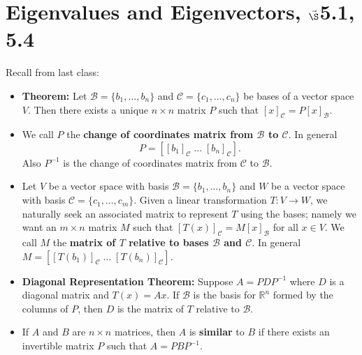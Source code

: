 


%
%
%

\section{{Eigenvalues and Eigenvectors, $\vec\S$5.1, 5.4}}%
% 

%
\thispagestyle{fancy}

Recall from last class:

\begin{itemize}
\item {\bf Theorem:} Let $\mathcal{B}=\{b_1, \dots, b_n\}$ and $\mathcal{C}=\{c_1, \dots, c_n\}$ be bases of a vector space $V$. Then there exists a unique $n\times n$ matrix $P$ such that $[x]_{\mathcal{C}}=P [x]_{\mathcal{B}}$.
\item We call $P$ the {\bf change of coordinates matrix from $\mathcal{B}$ to $\mathcal{C}$}. In general $$P= [[b_1]_\mathcal{C} \; \dots \; [b_n]_\mathcal{C}].$$ Also $P^{-1}$ is the change of coordinates matrix from $\mathcal{C}$ to $\mathcal{B}$.
\item Let $V$ be a vector space with basis $\mathcal{B}=\{b_1, \dots, b_n\}$ and $W$ be a vector space with basis $\mathcal{C}=\{c_1, \dots, c_m\}$. Given a linear transformation $T: V\to W$, we naturally seek an associated matrix to represent $T$ using the bases; namely we want an $m\times n$ matrix $M$ such that $[T(x)]_\mathcal{C}=M [x]_\mathcal{B}$ for all $x \in V$. We call $M$ the {\bf matrix of $T$ relative to bases $\mathcal{B}$ and $\mathcal{C}$}. In general $M= [[T(b_1)]_\mathcal{C} \; \dots \; [T(b_n)]_\mathcal{C}]$.
\item {\bf Diagonal Representation Theorem:} Suppose $A= P D P^{-1}$ where $D$ is a diagonal matrix and $T(x)=Ax$. If $\mathcal{B}$ is the basis for $\mathbb{R}^n$ formed by the columns of $P$, then $D$ is the matrix of $T$ relative to $\mathcal{B}$. 
\item If $A$ and $B$ are $n\times n$ matrices, then $A$ is {\bf similar} to $B$ if there exists an invertible matrix $P$ such that $A=PB P^{-1}$.
\end{itemize}

